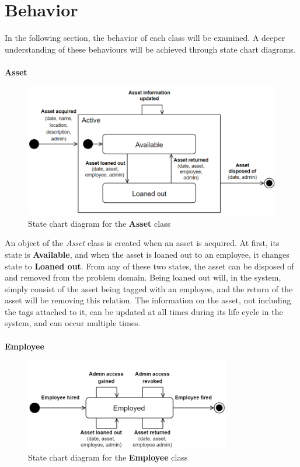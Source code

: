 \section{Behavior} \label{sc:behavoir}
In the following section, the behavior of each class will be examined. A deeper understanding of these behaviours will be achieved through state chart diagrams.
\\\\

\large{\textbf{Asset}}
\begin{figure}[H]
    \centering
    \includegraphics[width=1\textwidth]{figures/StateCharts/Asset_state_chart.png}
    \caption{State chart diagram for the \textbf{Asset} class}
    \label{fig:asset_statechart}
\end{figure}

An object of the \textit{Asset} class is created when an asset is acquired. At first, its state is \textbf{Available}, and when the asset is loaned out to an employee, it changes state to \textbf{Loaned out}. From any of these two states, the asset can be disposed of and removed from the problem domain. Being loaned out will, in the system, simply consist of the asset being tagged with an employee, and the return of the asset will be removing this relation. The information on the asset, not including the tags attached to it, can be updated at all times during its life cycle in the system, and can occur multiple times.
\\\\

\large{\textbf{Employee}}
\begin{figure}[H]
    \centering
    \includegraphics[width=0.8\textwidth]{figures/StateCharts/StateChart_Employee.png}
    \caption{State chart diagram for the \textbf{Employee} class}
    \label{fig:employee_statechart}
\end{figure}

